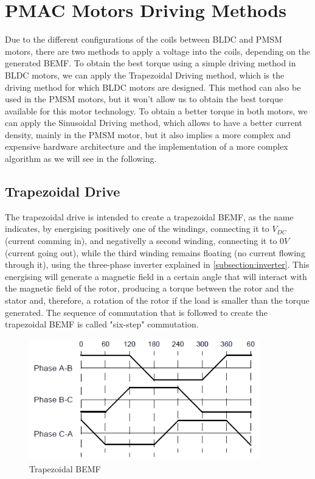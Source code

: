 \section{PMAC Motors Driving Methods}\label{section:driving_methods}

Due to the different configurations of the coils between \ac{BLDC} and \ac{PMSM} motors, there are two methods to apply a voltage into the coils, depending on the generated \ac{BEMF}. To obtain the best torque using a simple driving method in \ac{BLDC} motors, we can apply the Trapezoidal Driving method, which is the driving method for which \ac{BLDC} motors are designed. This method can also be used in the \ac{PMSM} motors, but it won't allow us to obtain the best torque available for this motor technology. To obtain a better torque in both motors, we can apply the Sinusoidal Driving method, which allows to have a better current density, mainly in the \ac{PMSM} motor, but it also implies a more complex and expensive hardware architecture and the implementation of a more complex algorithm as we will see in the following. 

\subsection{Trapezoidal Drive}\label{subsection:trapdrive}


The trapezoidal drive is intended to create a trapezoidal \ac{BEMF}, as the name indicates, by energising positively one of the windings, connecting it to $V_{DC}$ (current comming in), and negativelly a second winding, connecting it to $0V$ (current going out), while the third winding remains floating (no current flowing through it), using the three-phase inverter explained in \ref{subsection:inverter}. This energising will generate a magnetic field in a certain angle that will interact with the magnetic field of the rotor, producing a torque between the rotor and the stator and, therefore, a rotation of the rotor if the load is smaller than the torque generated. The sequence of commutation that is followed to create the trapezoidal \ac{BEMF} is called "six-step" commutation. 


\begin{figure}[htbp]
\centering
\includegraphics[width=10cm]{Images/trapezoidal_BEMF.png} 
\caption[Trapezoidal BEMF]{Trapezoidal BEMF}
\label{fig:trap_bemf}
\end{figure}

